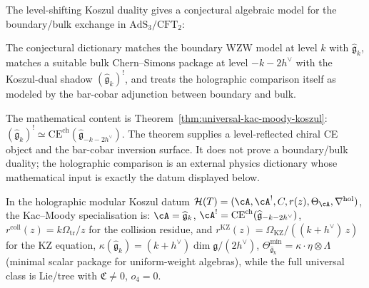 \begin{conjecture}\label{conj:km-holography}
The level-shifting Koszul duality gives a conjectural algebraic model
for the boundary/bulk exchange in $\mathrm{AdS}_3/\mathrm{CFT}_2$:
\begin{center}
\end{center}

The conjectural dictionary matches the boundary WZW model at level $k$
with $\widehat{\mathfrak{g}}_k$, matches a suitable bulk Chern--Simons
package at level $-k-2h^\vee$ with the Koszul-dual shadow
$(\widehat{\mathfrak{g}}_k)^!$, and treats the holographic comparison
itself as modeled by the bar-cobar adjunction between boundary and
bulk.
\end{conjecture}

\begin{remark}[Scope]
The mathematical content is
Theorem~\ref{thm:universal-kac-moody-koszul}:
\((\widehat{\mathfrak{g}}_k)^! \simeq
\mathrm{CE}^{\mathrm{ch}}(\widehat{\mathfrak{g}}_{-k-2h^\vee})\).
The theorem supplies a level-reflected chiral CE object and the
bar-cobar inversion surface.  It does not prove a boundary/bulk
duality; the holographic comparison is an external physics
dictionary whose mathematical input is exactly the datum displayed
below.

In the holographic modular Koszul datum
$\mathcal{H}(T) = (\cA, \cA^!, C, r(z), \Theta_\cA,
\nabla^{\mathrm{hol}})$,
the Kac--Moody specialisation is:
$\cA = \widehat{\mathfrak{g}}_k$,
$\cA^! =
\mathrm{CE}^{\mathrm{ch}}(\widehat{\mathfrak{g}}_{-k-2h^\vee})$,
$r^{\mathrm{coll}}(z)=k\Omega_{\mathrm{tr}}/z$ for the collision
residue, and
$r^{\mathrm{KZ}}(z) = \Omega_{\mathrm{KZ}}/((k{+}h^\vee)\,z)$ for
the KZ equation,
$\kappa(\widehat{\mathfrak{g}}_k) = (k+h^\vee)\dim\mathfrak{g}/(2h^\vee)$,
$\Theta_{\widehat{\mathfrak{g}}_k}^{\min}
= \kappa \cdot \eta \otimes \Lambda$
\textup{(}minimal scalar package for uniform-weight algebras\textup{)},
while the full universal class is Lie/tree with
$\mathfrak{C} \ne 0$, $o_4 = 0$.
\end{remark}

